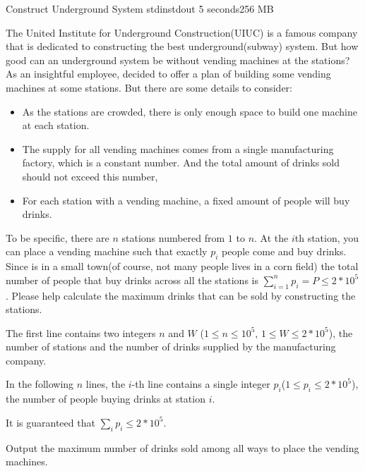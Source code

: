 \begin{problem}{Construct Underground System}
{stdin}{stdout}
{5 seconds}{256 MB}{}

The United Institute for Underground Construction(UIUC) is a famous company that is dedicated to constructing the best underground(subway) system. But how good can an underground system be without vending machines at the stations? As an insightful employee, \pittoresque decided to offer a plan of building some vending machines at some stations. But there are some details to consider:
\begin{itemize}
    \item As the stations are crowded, there is only enough space to build one machine at each station.
    \item The supply for all vending machines comes from a single manufacturing factory, which is a constant number. And the total amount of drinks sold should not exceed this number,
    \item For each station with a vending machine, a fixed amount of people will buy drinks. 
\end{itemize}

To be specific, there are $n$ stations numbered from $1$ to $n$. At the $i$th station, you can place a vending machine such that exactly $p_i$ people come and buy drinks. Since \pittoresque is in a small town(of course, not many people lives in a corn field) the total number of people that buy drinks across all the stations is $\sum_{i=1}^n p_i = P \leq 2 * 10^5$. Please help \pittoresque calculate the maximum drinks that can be sold by constructing the stations. 

\InputFile

The first line contains two integers $n$ and $W$ ($1 \le n \le 10^5$, $1 \le W \le 2 * 10^5$), the number of stations and the number of  drinks supplied by the manufacturing company.

In the following $n$ lines, the $i$-th line contains a single integer $p_i$($1 \le p_i \le 2 * 10^5$), the number of people buying drinks at station $i$.

It is guaranteed that $\sum_i p_i \leq 2 * 10^5$.

\OutputFile

Output the maximum number of drinks sold among all ways to place the vending machines.

\Examples

\begin{example}
%
\end{example}

\begin{example}
%
\end{example}



\end{problem}
